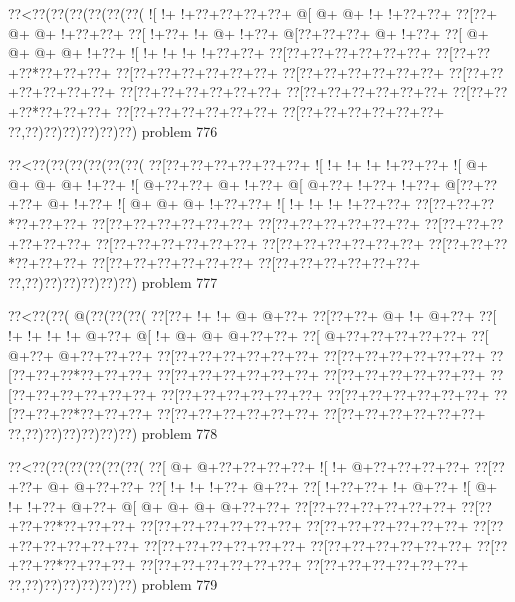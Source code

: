 \vbox{\vbox{\goo
\0??<\0??(\0??(\0??(\0??(\0??(\0??(
\- ![\- !+\- !+\0??+\0??+\0??+\0??+
\- @[\- @+\- @+\- !+\- !+\0??+\0??+
\0??[\0??+\- @+\- @+\- !+\0??+\0??+
\0??[\- !+\0??+\- !+\- @+\- !+\0??+
\- @[\0??+\0??+\0??+\- @+\- !+\0??+
\0??[\- @+\- @+\- @+\- @+\- !+\0??+
\- ![\- !+\- !+\- !+\- !+\0??+\0??+
\0??[\0??+\0??+\0??+\0??+\0??+\0??+
\0??[\0??+\0??+\0??*\0??+\0??+\0??+
\0??[\0??+\0??+\0??+\0??+\0??+\0??+
\0??[\0??+\0??+\0??+\0??+\0??+\0??+
\0??[\0??+\0??+\0??+\0??+\0??+\0??+
\0??[\0??+\0??+\0??+\0??+\0??+\0??+
\0??[\0??+\0??+\0??+\0??+\0??+\0??+
\0??[\0??+\0??+\0??*\0??+\0??+\0??+
\0??[\0??+\0??+\0??+\0??+\0??+\0??+
\0??[\0??+\0??+\0??+\0??+\0??+\0??+
\0??,\0??)\0??)\0??)\0??)\0??)\0??)
}
\hfil problem 776\hfil\break
}

\vbox{\vbox{\goo
\0??<\0??(\0??(\0??(\0??(\0??(\0??(
\0??[\0??+\0??+\0??+\0??+\0??+\0??+
\- ![\- !+\- !+\- !+\- !+\0??+\0??+
\- ![\- @+\- @+\- @+\- @+\- !+\0??+
\- ![\- @+\0??+\0??+\- @+\- !+\0??+
\- @[\- @+\0??+\- !+\0??+\- !+\0??+
\- @[\0??+\0??+\0??+\- @+\- !+\0??+
\- ![\- @+\- @+\- @+\- !+\0??+\0??+
\- ![\- !+\- !+\- !+\- !+\0??+\0??+
\0??[\0??+\0??+\0??*\0??+\0??+\0??+
\0??[\0??+\0??+\0??+\0??+\0??+\0??+
\0??[\0??+\0??+\0??+\0??+\0??+\0??+
\0??[\0??+\0??+\0??+\0??+\0??+\0??+
\0??[\0??+\0??+\0??+\0??+\0??+\0??+
\0??[\0??+\0??+\0??+\0??+\0??+\0??+
\0??[\0??+\0??+\0??*\0??+\0??+\0??+
\0??[\0??+\0??+\0??+\0??+\0??+\0??+
\0??[\0??+\0??+\0??+\0??+\0??+\0??+
\0??,\0??)\0??)\0??)\0??)\0??)\0??)
}
\hfil problem 777\hfil\break
}

\vbox{\vbox{\goo
\0??<\0??(\0??(\- @(\0??(\0??(\0??(
\0??[\0??+\- !+\- !+\- @+\- @+\0??+
\0??[\0??+\0??+\- @+\- !+\- @+\0??+
\0??[\- !+\- !+\- !+\- !+\- @+\0??+
\- @[\- !+\- @+\- @+\- @+\0??+\0??+
\0??[\- @+\0??+\0??+\0??+\0??+\0??+
\0??[\- @+\0??+\- @+\0??+\0??+\0??+
\0??[\0??+\0??+\0??+\0??+\0??+\0??+
\0??[\0??+\0??+\0??+\0??+\0??+\0??+
\0??[\0??+\0??+\0??*\0??+\0??+\0??+
\0??[\0??+\0??+\0??+\0??+\0??+\0??+
\0??[\0??+\0??+\0??+\0??+\0??+\0??+
\0??[\0??+\0??+\0??+\0??+\0??+\0??+
\0??[\0??+\0??+\0??+\0??+\0??+\0??+
\0??[\0??+\0??+\0??+\0??+\0??+\0??+
\0??[\0??+\0??+\0??*\0??+\0??+\0??+
\0??[\0??+\0??+\0??+\0??+\0??+\0??+
\0??[\0??+\0??+\0??+\0??+\0??+\0??+
\0??,\0??)\0??)\0??)\0??)\0??)\0??)
}
\hfil problem 778\hfil\break
}

\vbox{\vbox{\goo
\0??<\0??(\0??(\0??(\0??(\0??(\0??(
\0??[\- @+\- @+\0??+\0??+\0??+\0??+
\- ![\- !+\- @+\0??+\0??+\0??+\0??+
\0??[\0??+\0??+\- @+\- @+\0??+\0??+
\0??[\- !+\- !+\- !+\0??+\- @+\0??+
\0??[\- !+\0??+\0??+\- !+\- @+\0??+
\- ![\- @+\- !+\- !+\0??+\- @+\0??+
\- @[\- @+\- @+\- @+\- @+\0??+\0??+
\0??[\0??+\0??+\0??+\0??+\0??+\0??+
\0??[\0??+\0??+\0??*\0??+\0??+\0??+
\0??[\0??+\0??+\0??+\0??+\0??+\0??+
\0??[\0??+\0??+\0??+\0??+\0??+\0??+
\0??[\0??+\0??+\0??+\0??+\0??+\0??+
\0??[\0??+\0??+\0??+\0??+\0??+\0??+
\0??[\0??+\0??+\0??+\0??+\0??+\0??+
\0??[\0??+\0??+\0??*\0??+\0??+\0??+
\0??[\0??+\0??+\0??+\0??+\0??+\0??+
\0??[\0??+\0??+\0??+\0??+\0??+\0??+
\0??,\0??)\0??)\0??)\0??)\0??)\0??)
}
\hfil problem 779\hfil\break
}

